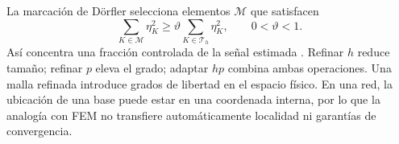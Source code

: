 La marcación de Dörfler selecciona elementos $\mathcal M$ que satisfacen
\begin{equation}
\sum_{K\in\mathcal M}\eta_K^2\geq\vartheta\sum_{K\in\mathcal T_h}\eta_K^2,
\qquad 0<\vartheta<1.
\end{equation}
Así concentra una fracción controlada de la señal estimada \cite{dorfler1996}. Refinar $h$ reduce tamaño; refinar $p$ eleva el grado; adaptar $hp$ combina ambas operaciones. Una malla refinada introduce grados de libertad en el espacio físico. En una red, la ubicación de una base puede estar en una coordenada interna, por lo que la analogía con FEM no transfiere automáticamente localidad ni garantías de convergencia.
